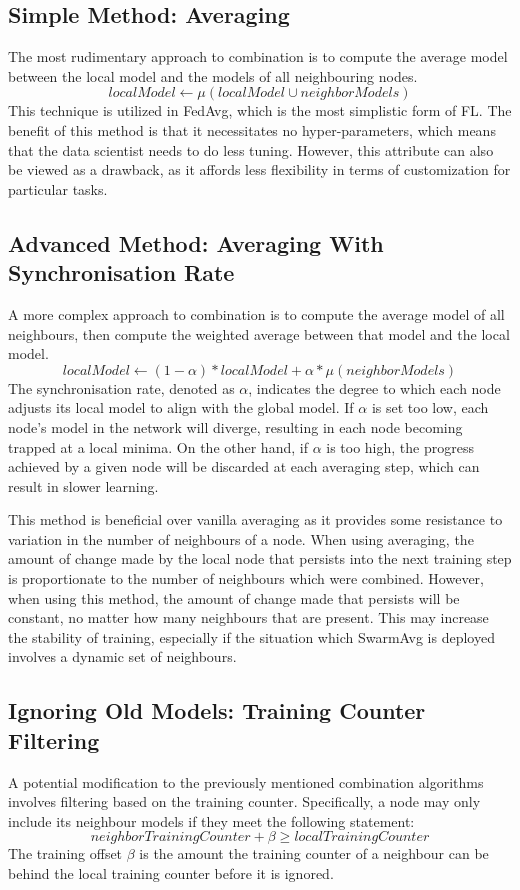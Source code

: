 \subsection{Simple Method: Averaging}
The most rudimentary approach to combination is to compute the average model between the local model and the models of all neighbouring nodes.
\[ localModel \gets \mu(localModel \cup neighborModels) \]
This technique is utilized in FedAvg, which is the most simplistic form of FL. The benefit of this method is that it necessitates no hyper-parameters, which means that the data scientist needs to do less tuning. However, this attribute can also be viewed as a drawback, as it affords less flexibility in terms of customization for particular tasks.

\subsection{Advanced Method: Averaging With Synchronisation Rate}
A more complex approach to combination is to compute the average model of all neighbours, then compute the weighted average between that model and the local model.
\[ localModel \gets (1 - \alpha) * localModel + \alpha * \mu(neighborModels) \]
The synchronisation rate, denoted as $\alpha$, indicates the degree to which each node adjusts its local model to align with the global model. If $\alpha$ is set too low, each node's model in the network will diverge, resulting in each node becoming trapped at a local minima. On the other hand, if $\alpha$ is too high, the progress achieved by a given node will be discarded at each averaging step, which can result in slower learning.

This method is beneficial over vanilla averaging as it provides some resistance to variation in the number of neighbours of a node. When using averaging, the amount of change made by the local node that persists into the next training step is proportionate to the number of neighbours which were combined. However, when using this method, the amount of change made that persists will be constant, no matter how many neighbours that are present. This may increase the stability of training, especially if the situation which SwarmAvg is deployed involves a dynamic set of neighbours.

\subsection{Ignoring Old Models: Training Counter Filtering}
A potential modification to the previously mentioned combination algorithms involves filtering based on the training counter. Specifically, a node may only include its neighbour models if they meet the following statement:
\[neighborTrainingCounter + \beta \ge localTrainingCounter \]
The training offset $\beta$ is the amount the training counter of a neighbour can be behind the local training counter before it is ignored.

